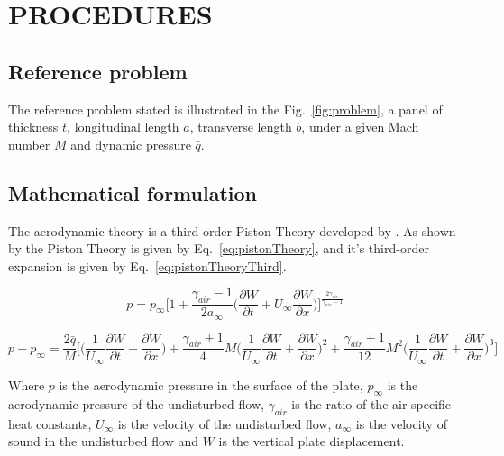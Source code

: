 \section{PROCEDURES}

\subsection{Reference problem}
The reference problem stated is illustrated in the Fig.~\ref{fig:problem}, a panel of thickness $t$,
longitudinal length $a$, transverse length $b$,
under a given Mach number $M$ and dynamic pressure $\bar{q}$.



\subsection{Mathematical formulation}

The aerodynamic theory is a third-order Piston Theory developed by \citet{ashley_piston_1956}. As shown by \cite{pegado_metodo_2003} the Piston Theory is given by Eq.~\ref{eq:pistonTheory}, and it's third-order expansion is
given by Eq.~\ref{eq:pistonTheoryThird}.

\begin{equation}
p = p_{\infty}\Bigg[1+\frac{\gamma_{air} - 1}{2 a_{\infty}}\bigg(\frac{\partial W}{\partial t} + U_{\infty}\frac{\partial W}{\partial x}\bigg)\Bigg]^{\frac{2\gamma_{air}}{\gamma_{air}-1}}
    \label{eq:pistonTheory}
\end{equation}

\begin{equation}
p - p_{\infty} = \frac{2\bar{q}}{M}
\Bigg[
\bigg(\frac{1}{U_{\infty}}
\frac{\partial W}{\partial t} + \frac{\partial W}{\partial x}\bigg)
+
\frac{\gamma_{air}+1}{4}M
\bigg(\frac{1}{U_{\infty}}
\frac{\partial W}{\partial t} + \frac{\partial W}{\partial x}\bigg)^2
+
\frac{\gamma_{air}+1}{12}M^2
\bigg(\frac{1}{U_{\infty}}
\frac{\partial W}{\partial t} + \frac{\partial W}{\partial x}\bigg)^3
\Bigg]
    \label{eq:pistonTheoryThird}
\end{equation}

Where $p$ is the aerodynamic pressure in the surface of the plate, $p_{\infty}$ is the aerodynamic pressure of the undisturbed flow, $\gamma_{air}$ is the ratio of the air specific heat constants, $U_{\infty}$ is the velocity of the undisturbed flow, $a_{\infty}$ is the velocity of sound in the undisturbed flow and $W$ is the vertical plate displacement.

